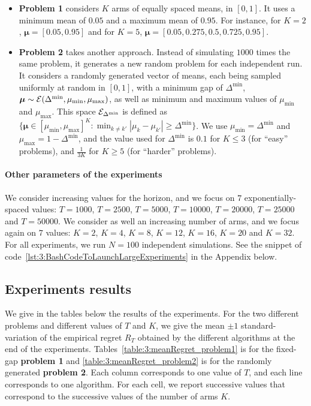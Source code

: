 \begin{itemize}
    \item \textbf{Problem 1} considers $K$ arms of equally spaced means, in $[0,1]$.
    It uses a minimum mean of $0.05$ and a maximum mean of $0.95$.
    For instance, for $K=2$, $\bm{\mu}=[0.05, 0.95]$ and for $K=5$, $\bm{\mu} = [0.05, 0.275, 0.5, 0.725, 0.95]$.

    \item \textbf{Problem 2} takes another approach. Instead of simulating $1000$ times the same problem, it generates a new random problem for each independent run.
    It considers a randomly generated vector of means, each being sampled uniformly at random in $[0,1]$, with a minimum gap of $\Delta^{\min}$, $\bm{\mu} \sim \mathcal{E}(\Delta^{\min},\mu_{\min},\mu_{\max})$, as well as minimum and maximum values of $\mu_{\min}$ and $\mu_{\max}$.
    This space $\mathcal{E}_{\Delta^{\min}}$ is defined as $\{ \bm{\mu} \in [\mu_{\min}, \mu_{\max}]^K : \min_{k\neq k'} |\mu_k - \mu_{k'}| \geq \Delta^{\min} \}$.
    We use $\mu_{\min} = \Delta^{\min}$ and $\mu_{\max} = 1 - \Delta^{\min}$,
    and the value used for $\Delta^{\min}$ is $0.1$ for $K \leq 3$ (for ``easy'' problems), and $\frac{1}{3 K}$ for $K \geq 5$ (for ``harder'' problems).
\end{itemize}


\paragraph{Other parameters of the experiments}

We consider increasing values for the horizon, and we focus on $7$ exponentially-spaced values: $T=1000$, $T=2500$, $T=5000$, $T=10000$, $T=20000$, $T=25000$ and $T=50000$.
We consider as well an increasing number of arms, and we focus again on $7$ values: $K=2$, $K=4$, $K=8$, $K=12$, $K=16$, $K=20$ and $K=32$.
For all experiments, we run $N=100$ independent simulations.
See the snippet of code~\ref{lst:3:BashCodeToLaunchLargeExperiments} in the Appendix below.


\subsection{Experiments results}

We give in the tables below the results of the experiments. For the two different problems and different values of $T$ and $K$, we give the mean $\pm 1$ standard-variation of the empirical regret $R_T$ obtained by the different algorithms at the end of the experiments.
Tables~\ref{table:3:meanRegret_problem1} is for the fixed-gap \textbf{problem 1}
and \ref{table:3:meanRegret_problem2} is for the randomly generated \textbf{problem 2}.
Each column corresponds to one value of $T$, and each line corresponds to one algorithm.
For each cell, we report successive values that correspond to the successive values of the number of arms $K$.

